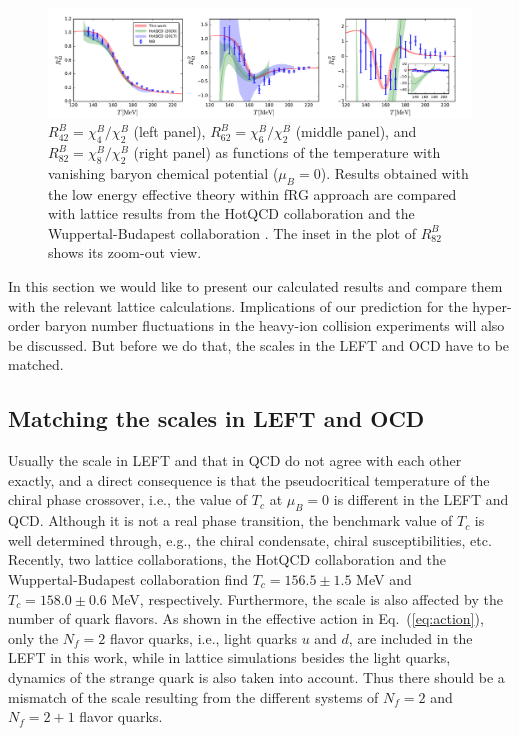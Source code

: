 \documentclass[%
reprint,
superscriptaddress,
showpacs,preprintnumbers,
 amsmath,amssymb,
 aps,
prd,
]{revtex4-1}
\def\Eq#1{Eq.~(\ref{#1})}
\begin{document}
%
\begin{figure}[t]
\includegraphics[width=1\textwidth]{R42R62R82-T-muB0}
\caption{$R^{B}_{42}=\chi^{B}_{4}/\chi^{B}_{2}$ (left panel), $R^{B}_{62}=\chi^{B}_{6}/\chi^{B}_{2}$ (middle panel), and $R^{B}_{82}=\chi^{B}_{8}/\chi^{B}_{2}$ (right panel) as functions of the temperature with vanishing baryon chemical potential ($\mu_B=0$). Results obtained with the low energy effective theory within fRG approach are compared with lattice results from the HotQCD collaboration \cite{Bazavov:2017dus,Bazavov:2017tot,Bazavov:2020bjn} and the Wuppertal-Budapest collaboration \cite{Borsanyi:2018grb}. The inset in the plot of $R^{B}_{82}$ shows its zoom-out view.}\label{fig:R42R62R82-T-muB0}
\end{figure}
%


In this section we would like to present our calculated results and compare them with the relevant lattice calculations. Implications of our prediction for the hyper-order baryon number fluctuations in the heavy-ion collision experiments will also be discussed. But before we do that, the scales in the LEFT and OCD have to be matched.

\subsection{Matching the scales in LEFT and OCD}
\label{subsec:scale}

Usually the scale in LEFT and that in QCD do not agree with each other exactly, and a direct consequence is that the pseudocritical temperature of the chiral phase crossover, i.e., the value of $T_c$ at $\mu_B=0$ is different in the LEFT and QCD. Although it is not a real phase transition, the benchmark value of $T_c$ is well determined through, e.g., the chiral condensate, chiral susceptibilities, etc. Recently, two lattice collaborations, the HotQCD collaboration and the Wuppertal-Budapest collaboration find $T_c=156.5\pm 1.5$ MeV \cite{Bazavov:2018mes} and $T_c=158.0\pm 0.6$ MeV, respectively. Furthermore, the scale is also affected by the number of quark flavors. As shown in the effective action in \Eq{eq:action}, only the $N_f=2$ flavor quarks, i.e., light quarks $u$ and $d$, are included in the LEFT in this work, while in lattice simulations besides the light quarks, dynamics of the strange quark is also taken into account. Thus there should be a mismatch of the scale resulting from the different systems of $N_f=2$ and $N_f=2+1$ flavor quarks.
\end{document}
